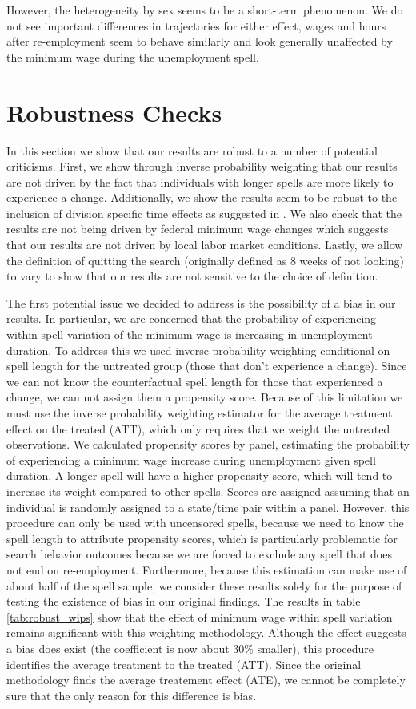 \documentclass{article}
\begin{document}
However, the heterogeneity by sex seems to be a short-term phenomenon. We do not see important differences in trajectories for either effect, wages and hours after re-employment seem to behave similarly and look generally unaffected by the minimum wage during the unemployment spell.

\section{Robustness Checks}
In this section we show that our results are robust to a number of potential criticisms. First, we show through inverse probability weighting that our results are not driven by the fact that individuals with longer spells are more likely to experience a change. Additionally, we show the results seem to be robust to the inclusion of division specific time effects as suggested in \cite{allegretto2011minimum}. We also check that the results are not being driven by federal minimum wage changes which suggests that our results are not driven by local labor market conditions. Lastly, we allow the definition of quitting the search (originally defined as 8 weeks of not looking) to vary to show that our results are not sensitive to the choice of definition.

The first potential issue we decided to address is the possibility of a bias in our results. In particular, we are concerned that the probability of experiencing within spell variation of the minimum wage is increasing in unemployment duration. To address this we used inverse probability weighting conditional on spell length for the untreated group (those that don't experience a change). Since we can not know the counterfactual spell length for those that experienced a change, we can not assign them a propensity score. Because of this limitation we must use the inverse probability weighting estimator for the average treatment effect on the treated (ATT), which only requires that we weight the untreated observations. We calculated propensity scores by panel, estimating the probability of experiencing a minimum wage increase during unemployment given spell duration. A longer spell will have a higher propensity score, which will tend to increase its weight compared to other spells. Scores are assigned assuming that an individual is randomly assigned to a state/time pair within a panel. However, this procedure can only be used with uncensored spells, because we need to know the spell length to attribute propensity scores, which is particularly problematic for search behavior outcomes because we are forced to exclude any spell that does not end on re-employment. Furthermore, because this estimation can make use of about half of the spell sample, we consider these results solely for the purpose of testing the existence of bias in our original findings. The results in table \ref{tab:robust_wips} show that the effect of minimum wage within spell variation remains significant with this weighting methodology. Although the effect suggests a bias does exist (the coefficient is now about 30\% smaller), this procedure identifies the average treatment to the treated (ATT). Since the original methodology finds the average treatement effect (ATE), we cannot be completely sure that the only reason for this difference is bias.
\end{document}
